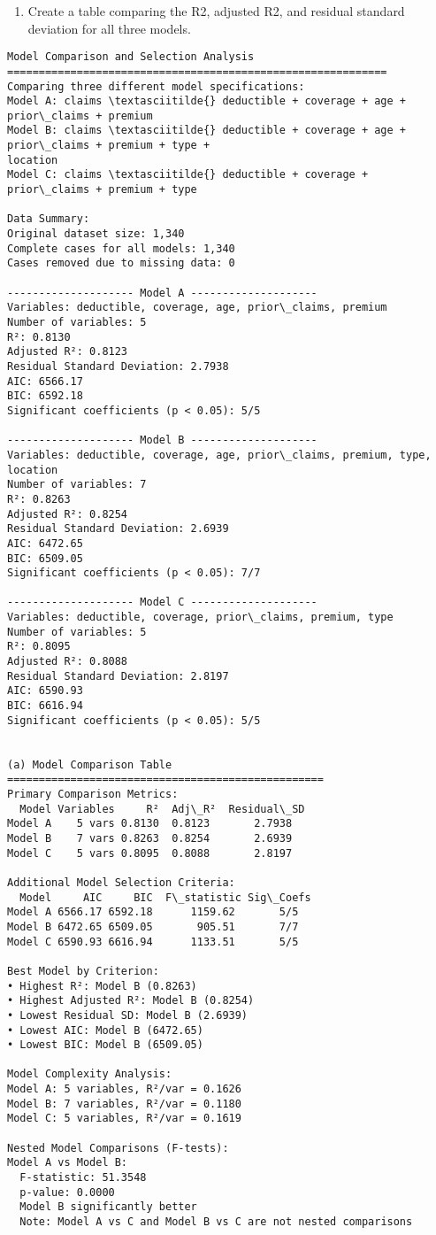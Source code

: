 \documentclass[8pt, twocolumn]{extarticle}
\providecommand{\tightlist}{%
      \setlength{\itemsep}{0pt}\setlength{\parskip}{0pt}}
\begin{document}
    \begin{enumerate}
\def\labelenumi{(\alph{enumi})}
\tightlist
\item
  Create a table comparing the R2, adjusted R2, and residual standard
  deviation for all three models.
\end{enumerate}

    \begin{Verbatim}[commandchars=\\\{\}]
Model Comparison and Selection Analysis
============================================================
Comparing three different model specifications:
Model A: claims \textasciitilde{} deductible + coverage + age + prior\_claims + premium
Model B: claims \textasciitilde{} deductible + coverage + age + prior\_claims + premium + type +
location
Model C: claims \textasciitilde{} deductible + coverage + prior\_claims + premium + type

Data Summary:
Original dataset size: 1,340
Complete cases for all models: 1,340
Cases removed due to missing data: 0

-------------------- Model A --------------------
Variables: deductible, coverage, age, prior\_claims, premium
Number of variables: 5
R²: 0.8130
Adjusted R²: 0.8123
Residual Standard Deviation: 2.7938
AIC: 6566.17
BIC: 6592.18
Significant coefficients (p < 0.05): 5/5

-------------------- Model B --------------------
Variables: deductible, coverage, age, prior\_claims, premium, type, location
Number of variables: 7
R²: 0.8263
Adjusted R²: 0.8254
Residual Standard Deviation: 2.6939
AIC: 6472.65
BIC: 6509.05
Significant coefficients (p < 0.05): 7/7

-------------------- Model C --------------------
Variables: deductible, coverage, prior\_claims, premium, type
Number of variables: 5
R²: 0.8095
Adjusted R²: 0.8088
Residual Standard Deviation: 2.8197
AIC: 6590.93
BIC: 6616.94
Significant coefficients (p < 0.05): 5/5


(a) Model Comparison Table
==================================================
Primary Comparison Metrics:
  Model Variables     R²  Adj\_R²  Residual\_SD
Model A    5 vars 0.8130  0.8123       2.7938
Model B    7 vars 0.8263  0.8254       2.6939
Model C    5 vars 0.8095  0.8088       2.8197

Additional Model Selection Criteria:
  Model     AIC     BIC  F\_statistic Sig\_Coefs
Model A 6566.17 6592.18      1159.62       5/5
Model B 6472.65 6509.05       905.51       7/7
Model C 6590.93 6616.94      1133.51       5/5

Best Model by Criterion:
• Highest R²: Model B (0.8263)
• Highest Adjusted R²: Model B (0.8254)
• Lowest Residual SD: Model B (2.6939)
• Lowest AIC: Model B (6472.65)
• Lowest BIC: Model B (6509.05)

Model Complexity Analysis:
Model A: 5 variables, R²/var = 0.1626
Model B: 7 variables, R²/var = 0.1180
Model C: 5 variables, R²/var = 0.1619

Nested Model Comparisons (F-tests):
Model A vs Model B:
  F-statistic: 51.3548
  p-value: 0.0000
  Model B significantly better
  Note: Model A vs C and Model B vs C are not nested comparisons
    \end{Verbatim}
\end{document}
